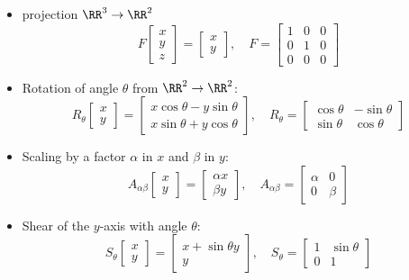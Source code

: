 \documentclass[9pt]{beamer}
\begin{document}
\begin{frame}
  \begin{itemize}
  \item projection $\RR^3\to\RR^2$
    $$
    F
    \begin{bmatrix}
      x \\y \\z
    \end{bmatrix}
    =
    \begin{bmatrix}
      x \\y
    \end{bmatrix},\quad F =
    \begin{bmatrix}
      1 & 0 & 0\\
      0 & 1 & 0\\
      0 & 0 & 0
    \end{bmatrix}
    $$
  \item Rotation of angle $\theta$ from $\RR^2\to\RR^2$:
    $$
    R_\theta
    \begin{bmatrix}
      x \\y
    \end{bmatrix}
    =
    \begin{bmatrix}
      x\cos\theta - y\sin\theta\\
      x\sin\theta + y\cos\theta
    \end{bmatrix},\quad
    R_\theta =
    \begin{bmatrix}
      \cos\theta & -\sin\theta\\
      \sin\theta & \cos\theta
    \end{bmatrix}
    $$
  \item Scaling by a factor $\alpha$ in $x$ and $\beta$ in $y$:
    $$
    A_{\alpha\beta}
    \begin{bmatrix}
     x\\y 
    \end{bmatrix}
    = 
    \begin{bmatrix}
      \alpha x\\
      \beta y
    \end{bmatrix},\quad
    A_{\alpha\beta} =
    \begin{bmatrix}
      \alpha & 0\\0 & \beta
    \end{bmatrix}
    $$
  \item Shear of the $y$-axis with  angle $\theta$:
    $$
    S_\theta
    \begin{bmatrix}
      x\\y
    \end{bmatrix}
    =
    \begin{bmatrix}
      x + \sin\theta y\\
      y
    \end{bmatrix},\quad
    S_\theta =
    \begin{bmatrix}
      1 &\sin\theta\\
      0 & 1
    \end{bmatrix}
    $$
  \end{itemize}
\end{frame}
\end{document}
